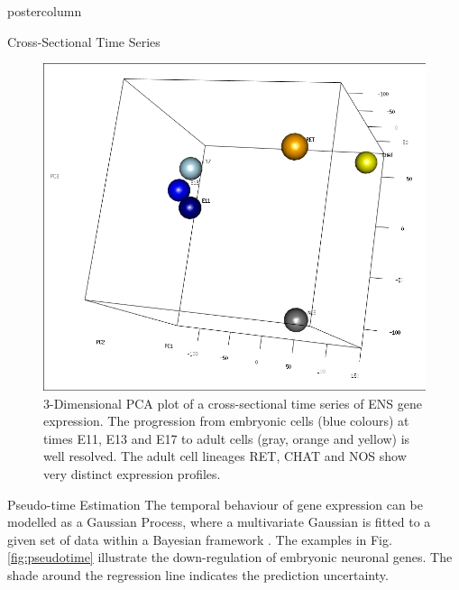 \documentclass{beamer}
\begin{document}
\begin{frame}
\begin{columns}
\begin{column}{.45\textwidth}
\begin{beamercolorbox}[center]{postercolumn}
\begin{minipage}{.98\textwidth}
{\begin{myblock}{Cross-Sectional Time Series}
\begin{figure}
\begin{minipage}{1.0\textwidth}
	\centering\includegraphics[width=1.0\textwidth]{./time_series}
	\caption{3-Dimensional PCA plot of a cross-sectional time series of ENS
			gene expression. The progression from embryonic cells (blue colours)
			at times E11, E13 and E17 to adult cells (gray, orange and yellow)
			is well resolved. The adult cell lineages RET, CHAT and NOS
			show very distinct expression profiles.}
	\label{fig:timeseries}
\end{minipage}
\end{figure}
\end{myblock}\vfill
\begin{myblock}{Pseudo-time Estimation}
The temporal behaviour of gene expression can be modelled as a Gaussian Process,
where a multivariate Gaussian is fitted to a given set of data
within a Bayesian framework \cite{Reid_2016}. The examples in
Fig.\ref{fig:pseudotime} illustrate the down-regulation of embryonic neuronal
genes. The shade around the regression line indicates the prediction uncertainty.
\begin{figure}
\begin{minipage}{\textwidth}

\end{minipage}
\end{figure}
\end{myblock}}
\end{minipage}
\end{beamercolorbox}
\end{column}
\end{columns}
\end{frame}
\end{document}
